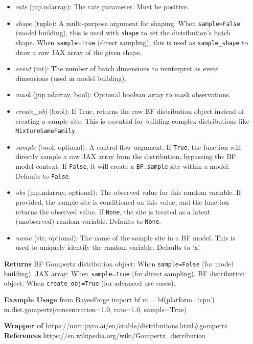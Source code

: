 \documentclass[
  letterpaper,
  DIV=11,
  numbers=noendperiod]{scrartcl}
\begin{document}
\begin{itemize}
\item
  \emph{rate} (jnp.ndarray): The rate parameter. Must be positive.
\item
  \emph{shape} (tuple): A multi-purpose argument for shaping. When
  \texttt{sample=False} (model building), this is used with
  \texttt{shape} to set the distribution's batch shape. When
  \texttt{sample=True} (direct sampling), this is used as
  \texttt{sample\_shape} to draw a raw JAX array of the given shape.
\item
  \emph{event} (int): The number of batch dimensions to reinterpret as
  event dimensions (used in model building).
\item
  \emph{mask} (jnp.ndarray, bool): Optional boolean array to mask
  observations.
\item
  \emph{create\_obj} (bool): If True, returns the raw BF distribution
  object instead of creating a sample site. This is essential for
  building complex distributions like \texttt{MixtureSameFamily}.
\item
  \emph{sample} (bool, optional): A control-flow argument. If
  \texttt{True}, the function will directly sample a raw JAX array from
  the distribution, bypassing the BF model context. If \texttt{False},
  it will create a \texttt{BF.sample} site within a model. Defaults to
  \texttt{False}.
\item
  \emph{obs} (jnp.ndarray, optional): The observed value for this random
  variable. If provided, the sample site is conditioned on this value,
  and the function returns the observed value. If \texttt{None}, the
  site is treated as a latent (unobserved) random variable. Defaults to
  \texttt{None}.
\item
  \emph{name} (str, optional): The name of the sample site in a BF
  model. This is used to uniquely identify the random variable. Defaults
  to `x'.
\end{itemize}

\textbf{Returns} BF Gompertz distribution object: When
\texttt{sample=False} (for model building). JAX array: When
\texttt{sample=True} (for direct sampling). BF distribution object: When
\texttt{create\_obj=True} (for advanced use cases).

\textbf{Example Usage} from BayesForge import bf m = bf(platform=`cpu')
m.dist.gompertz(concentration=1.0, rate=1.0, sample=True)

\textbf{Wrapper of}
https://num.pyro.ai/en/stable/distributions.html\#gompertz
\textbf{References} https://en.wikipedia.org/wiki/Gompertz\_distribution
\end{document}
